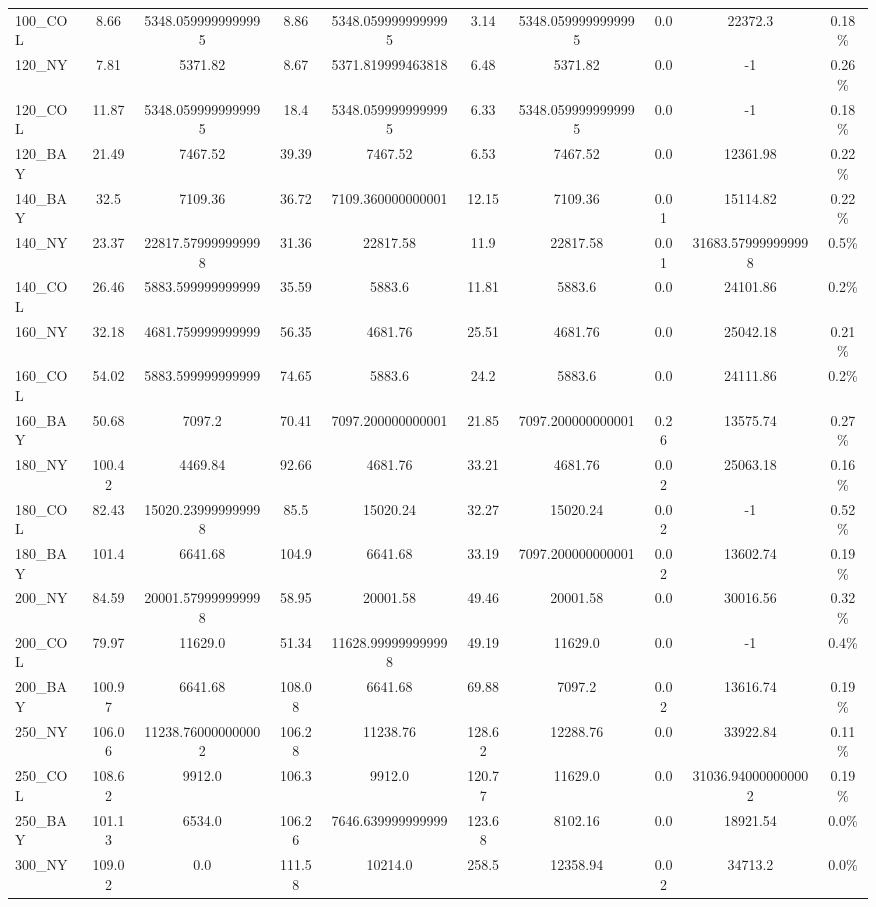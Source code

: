 \documentclass[main.tex]{subfiles}
\begin{document}
\begin{center}
\begin{tabular}{lccccccccc}
100\_COL & 8.66 & 5348.0599999999995 & 8.86 & 5348.0599999999995 & 3.14 & 5348.0599999999995 & 0.0 & 22372.3 & 0.18\%\\
120\_NY & 7.81 & 5371.82 & 8.67 & 5371.819999463818 & 6.48 & 5371.82 & 0.0 & -1 & 0.26\%\\
120\_COL & 11.87 & 5348.0599999999995 & 18.4 & 5348.0599999999995 & 6.33 & 5348.0599999999995 & 0.0 & -1 & 0.18\%\\
120\_BAY & 21.49 & 7467.52 & 39.39 & 7467.52 & 6.53 & 7467.52 & 0.0 & 12361.98 & 0.22\%\\
140\_BAY & 32.5 & 7109.36 & 36.72 & 7109.360000000001 & 12.15 & 7109.36 & 0.01 & 15114.82 & 0.22\%\\
140\_NY & 23.37 & 22817.579999999998 & 31.36 & 22817.58 & 11.9 & 22817.58 & 0.01 & 31683.579999999998 & 0.5\%\\
140\_COL & 26.46 & 5883.599999999999 & 35.59 & 5883.6 & 11.81 & 5883.6 & 0.0 & 24101.86 & 0.2\%\\
160\_NY & 32.18 & 4681.759999999999 & 56.35 & 4681.76 & 25.51 & 4681.76 & 0.0 & 25042.18 & 0.21\%\\
160\_COL & 54.02 & 5883.599999999999 & 74.65 & 5883.6 & 24.2 & 5883.6 & 0.0 & 24111.86 & 0.2\%\\
160\_BAY & 50.68 & 7097.2 & 70.41 & 7097.200000000001 & 21.85 & 7097.200000000001 & 0.26 & 13575.74 & 0.27\%\\
180\_NY & 100.42 & 4469.84 & 92.66 & 4681.76 & 33.21 & 4681.76 & 0.02 & 25063.18 & 0.16\%\\
180\_COL & 82.43 & 15020.239999999998 & 85.5 & 15020.24 & 32.27 & 15020.24 & 0.02 & -1 & 0.52\%\\
180\_BAY & 101.4 & 6641.68 & 104.9 & 6641.68 & 33.19 & 7097.200000000001 & 0.02 & 13602.74 & 0.19\%\\
200\_NY & 84.59 & 20001.579999999998 & 58.95 & 20001.58 & 49.46 & 20001.58 & 0.0 & 30016.56 & 0.32\%\\
200\_COL & 79.97 & 11629.0 & 51.34 & 11628.999999999998 & 49.19 & 11629.0 & 0.0 & -1 & 0.4\%\\
200\_BAY & 100.97 & 6641.68 & 108.08 & 6641.68 & 69.88 & 7097.2 & 0.02 & 13616.74 & 0.19\%\\
250\_NY & 106.06 & 11238.760000000002 & 106.28 & 11238.76 & 128.62 & 12288.76 & 0.0 & 33922.84 & 0.11\%\\
250\_COL & 108.62 & 9912.0 & 106.3 & 9912.0 & 120.77 & 11629.0 & 0.0 & 31036.940000000002 & 0.19\%\\
250\_BAY & 101.13 & 6534.0 & 106.26 & 7646.639999999999 & 123.68 & 8102.16 & 0.0 & 18921.54 & 0.0\%\\
300\_NY & 109.02 & 0.0 & 111.58 & 10214.0 & 258.5 & 12358.94 & 0.02 & 34713.2 & 0.0\%\\
\hline\end{tabular}
\end{center}
\end{document}
